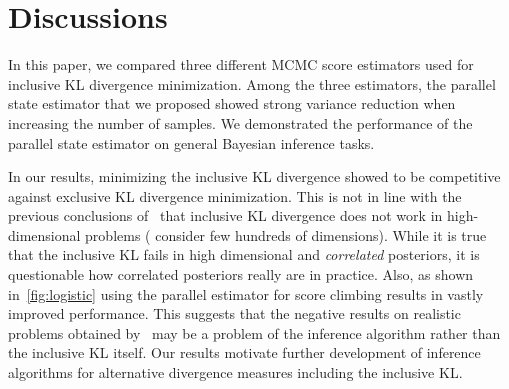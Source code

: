 
\vspace{-0.1in}
\section{Discussions}\label{section:discussion}
\vspace{-0.1in}
In this paper, we compared three different MCMC score estimators used for inclusive KL divergence minimization.
Among the three estimators, the parallel state estimator that we proposed showed strong variance reduction when increasing the number of samples.
We demonstrated the performance of the parallel state estimator on general Bayesian inference tasks.

In our results, minimizing the inclusive KL divergence showed to be competitive against exclusive KL divergence minimization.
This is not in line with the previous conclusions of~\citet{dhaka_challenges_2021} that inclusive KL divergence does not work in high-dimensional problems (\citeauthor{dhaka_challenges_2021} consider few hundreds of dimensions).
While it is true that the inclusive KL fails in high dimensional and \textit{correlated} posteriors, it is questionable how correlated posteriors really are in practice.
Also, as shown in~\cref{fig:logistic} using the parallel estimator for score climbing results in vastly improved performance.
This suggests that the negative results on realistic problems obtained by~\citet{dhaka_challenges_2021} may be a problem of the inference algorithm rather than the inclusive KL itself.
Our results motivate further development of inference algorithms for alternative divergence measures including the inclusive KL. 


